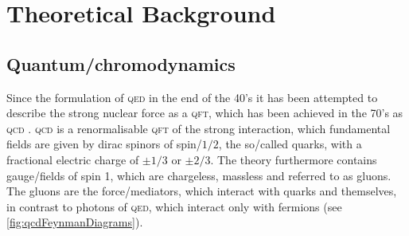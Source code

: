 \documentclass[../../index.tex]{subfiles}
\begin{document}
\chapter{Theoretical Background}
\label{ch:theoreticalBackground}

\section{Quantum\-/chromodynamics}
\label{sec:quantumchromodynamics}
Since the formulation of \textsc{qed} in the end of the 40's it has been
attempted to describe the strong nuclear force as a \textsc{qft}, which has been
achieved in the 70's as \textsc{qcd}
\cite{GellMann1972,Fritzsch1973,Gross1973,Politzer1973,Weinberg1973}.
\textsc{qcd} is a renormalisable \textsc{qft} of the strong interaction, which
fundamental fields are given by dirac spinors of spin\-/$1/2$, the so\-/called
quarks, with a fractional electric charge of $\pm 1/3$ or $\pm 2/3$. The theory
furthermore contains gauge\-/fields of spin 1, which are chargeless, massless
and referred to as gluons. The gluons are the force\-/mediators, which interact
with quarks and themselves, in contrast to photons of \textsc{qed}, which
interact only with fermions (see \cref{fig:qcdFeynmanDiagrams}).
\end{document}
